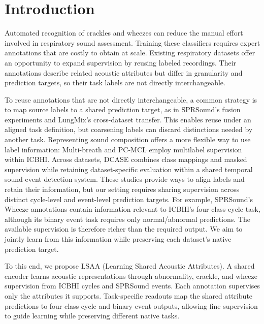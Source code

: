 \section{Introduction}
\label{sec:introduction}

Automated recognition of crackles and wheezes can reduce the manual effort
involved in respiratory sound assessment\cite{hsu2021hflung}.
Training these classifiers requires expert annotations that are costly
to obtain at scale\cite{zhang2024opera}. Existing respiratory
datasets\cite{rocha2019icbhi,zhang2022sprsound} offer an opportunity to
expand supervision by reusing labeled recordings. Their annotations
describe related acoustic attributes but differ in granularity and
prediction targets, so their task labels are not directly interchangeable.

To reuse annotations that are not directly interchangeable, a common
strategy is to map source labels to a shared prediction target, as in
SPRSound's fusion experiments and LungMix's cross-dataset
transfer\cite{zhang2022sprsound,ge2025lungmix}. This enables reuse under an
aligned task definition, but coarsening labels can discard distinctions
needed by another task. Representing sound composition offers a more
flexible way to use label information: Multi-breath and PC-MCL employ
multilabel supervision within ICBHI\cite{chua2024multibreath,jeong2026pcmcl}.
Across datasets, DCASE combines class mappings and masked supervision while
retaining dataset-specific evaluation within a shared temporal sound-event
detection system\cite{cornell2024dcase}. These studies provide ways to align
labels and retain their information, but our setting requires sharing
supervision across distinct cycle-level and event-level prediction targets.
For example, SPRSound's Wheeze annotations contain information relevant to
ICBHI's four-class cycle task, although its binary event task requires only
normal/abnormal predictions\cite{zhang2022sprsound}. The available supervision
is therefore richer than the required output. We aim to jointly learn from
this information while preserving each dataset's native prediction target.

To this end, we propose LSAA (Learning Shared Acoustic Attributes).
A shared encoder learns acoustic representations through abnormality,
crackle, and wheeze supervision from ICBHI cycles and SPRSound events.
Each annotation supervises only the attributes it supports.
Task-specific readouts map the shared attribute predictions to four-class
cycle and binary event outputs, allowing fine supervision to guide
learning while preserving different native tasks.

